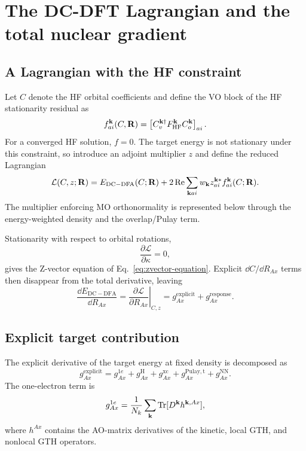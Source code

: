 \section{The DC-DFT Lagrangian and the total nuclear gradient}
\label{sec:dc-lagrangian}

\subsection{A Lagrangian with the HF constraint}

Let $C$ denote the HF orbital coefficients and define the VO block of the HF
stationarity residual as
\begin{equation}
  f_{ai}^{\mathbf{k}}(C,\mathbf{R})
  =\left[C_v^{\mathbf{k}\dagger}F_{\mathrm{HF}}^{\mathbf{k}}C_o^{\mathbf{k}}\right]_{ai}.
  \label{eq:hf-stationarity-residual}
\end{equation}
For a converged HF solution, $f=0$.  The target energy is not stationary under
this constraint, so introduce an adjoint multiplier $z$ and define the reduced
Lagrangian
\begin{equation}
  \mathcal L(C,z;\mathbf{R})
  =E_{\mathrm{DC-DFA}}(C;\mathbf{R})
   +2\operatorname{Re}\sum_{\mathbf{k} ai}w_{\mathbf{k}}
    z_{ai}^{\mathbf{k} *}f_{ai}^{\mathbf{k}}(C;\mathbf{R}).
  \label{eq:dc-lagrangian}
\end{equation}
The multiplier enforcing MO orthonormality is represented below through the
energy-weighted density and the overlap/Pulay term.

Stationarity with respect to orbital rotations,
\begin{equation}
  \frac{\partial\mathcal L}{\partial\kappa}=0,
  \label{eq:lagrangian-orbital-stationarity}
\end{equation}
gives the Z-vector equation of Eq.~\eqref{eq:zvector-equation}.  Explicit
$\dd C/\dd R_{Ax}$ terms then disappear from the total derivative, leaving
\begin{equation}
  \frac{\dd E_{\mathrm{DC-DFA}}}{\dd R_{Ax}}
  =\left.\frac{\partial\mathcal L}{\partial R_{Ax}}\right|_{C,z}
  =g_{Ax}^{\mathrm{explicit}}+g_{Ax}^{\mathrm{response}}.
  \label{eq:dc-gradient-master}
\end{equation}

\subsection{Explicit target contribution}

The explicit derivative of the target energy at fixed density is decomposed as
\begin{equation}
  g_{Ax}^{\mathrm{explicit}}
  =g_{Ax}^{1e}+g_{Ax}^{\mathrm H}+g_{Ax}^{\mathrm{xc}}
   +g_{Ax}^{\mathrm{Pulay,t}}+g_{Ax}^{\mathrm{NN}}.
  \label{eq:explicit-gradient-decomposition}
\end{equation}
The one-electron term is
\begin{equation}
  g_{Ax}^{1e}
  =\frac{1}{N_k}\sum_{\mathbf{k}}
    \operatorname{Tr}[D^{\mathbf{k}}h^{\mathbf{k},Ax}],
  \label{eq:one-electron-gradient}
\end{equation}
where $h^{Ax}$ contains the AO-matrix derivatives of the kinetic, local GTH,
and nonlocal GTH operators.

